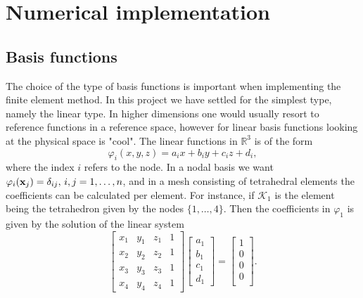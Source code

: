 \section{Numerical implementation}
\subsection{Basis functions}
The choice of the type of basis functions is important when implementing the finite element method. In this project we have settled for the simplest type, namely the linear type. In higher dimensions one would usually resort to reference functions in a reference space, however for linear basis functions looking at the physical space is "cool". The linear functions in $\mathbb{R}^3$ is of the form
\begin{equation}
	\varphi_i(x,y,z) = a_ix + b_iy + c_iz + d_i,
\end{equation}
where the index $i$ refers to the node. In a nodal basis we want $\varphi_i(\vb{x}_j) = \delta_{ij},\, i,j = 1,\dots,n$, and in a mesh consisting of tetrahedral elements the coefficients can be calculated per element. For instance, if $\mathcal{K}_1$ is the element being the tetrahedron given by the nodes $\{1,\dots,4\}$. Then the coefficients in $\varphi_1$ is given by the solution of the linear system
\begin{equation}
    \begin{bmatrix}
        x_1 & y_1 & z_1 & 1 \\
        x_2 & y_2 & z_2 & 1 \\
        x_3 & y_3 & z_3 & 1 \\
        x_4 & y_4 & z_4 & 1
     \end{bmatrix}
     \begin{bmatrix}
        a_1 \\
        b_1 \\
        c_1 \\
        d_1 
    \end{bmatrix}
    =
    \begin{bmatrix}
        1 \\
        0 \\
        0 \\
        0 \\
    \end{bmatrix}.
    \label{eq:coeff_sys}
\end{equation}

